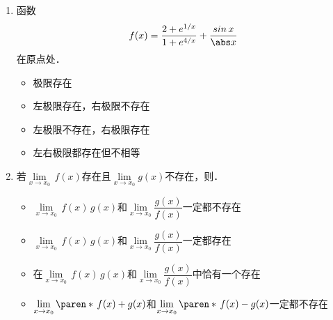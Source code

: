 \documentclass[a4paper,punct=CCT]{ctexbook}
\renewcommand*{\siand}{\shortintertext{和}}
\theoremstyle{definition}
\theoremstyle{remark}
\newif\ifshowsol
\begin{document}
\begin{enumerate}
\item 函数
  \begin{equation*}
    f(x) = \frac{2+e^{1/x}}{1+e^{4/x}} + \frac{\sin x}{\abs x}
  \end{equation*}
  在原点处\uline{\makebox[6em]{}}．
  \begin{itemize}
    \renewcommand{\labelitemi}{\faCircleThin}
    \ifshowsol
  \item[\faCircle]
    \else
  \item
    \fi
    极限存在
  \item 左极限存在，右极限不存在
  \item 左极限不存在，右极限存在
  \item 左右极限都存在但不相等
  \end{itemize}

  \ifshowsol
  实际上，有
  \begin{gather*}
    \lim_{\,x\to0^+} \,f(x)
    = {}\smashoperator[l]{\lim_{\,x\to0^+}} \paren[\bigg]{\frac{2/e^{1/x} + 1}{1/e^{1/x} + e^{3/x}} + \frac{\sin x}{x}}
    = 1
    \siand
    \lim_{\,x\to0^-} \,f(x)
    = {}\smashoperator[l]{\lim_{\,x\to0^-}} \paren[\bigg]{\frac{2+e^{1/x}}{1+e^{4/x}} - \frac{\sin x}{x}}
    = 1.
  \end{gather*}
  所以函数\(f\)在原点处的极限是\(1\)．
  \fi

\item 若\(\lim\limits_{x \to x_0} \,f(x)\)存在且\(\lim\limits_{x \to x_0} g(x)\)不存在，则\uline{\makebox[10em]{}}．
  \begin{itemize}[itemsep=1ex]
    \renewcommand{\labelitemi}{\faCircleThin}
  \item \(\lim\limits_{x \to x_0} \,f(x)\,g(x)\)和\(\lim\limits_{x \to x_0} \dfrac{g(x)}{f(x)}\)一定都不存在
  \item \(\lim\limits_{x \to x_0} \,f(x)\,g(x)\)和\(\lim\limits_{x \to x_0} \dfrac{g(x)}{f(x)}\)一定都存在
  \item 在\(\lim\limits_{x \to x_0} \,f(x)\,g(x)\)和\(\lim\limits_{x \to x_0} \dfrac{g(x)}{f(x)}\)中恰有一个存在
    \ifshowsol
  \item[\faCircle]
    \else
  \item
    \fi
    \(\lim\limits_{x \to x_0} \paren*{\,f(x)+g(x)}\)和\(\lim\limits_{x \to x_0} \paren*{\,f(x)-g(x)}\)一定都不存在
  \end{itemize}

  \ifshowsol
  令\(f(x) = x\)和\(g(x) = 1/x\)，可以证伪选项A和B．在此基础上，令\(g(x) = 1/x^2\)，可以证伪选项C．实际上，在题干的条件下，\(\lim\limits_{x \to x_0} \paren*{\,f(x)+g(x)}\)、\(\lim\limits_{x \to x_0} \paren*{\,f(x)-g(x)}\)和\(\lim\limits_{x \to x_0} \dfrac{g(x)}{f(x)}\)一定都不存在．当\(\lim\limits_{x \to x_0} \,f(x) \ne 0\)时，\(\lim\limits_{x \to x_0} \,f(x)\,g(x)\)一定不存在．当\(\lim\limits_{x \to x_0} \,f(x) = 0\)时，\(\lim\limits_{x \to x_0} \,f(x)\,g(x)\)可能存在也可能不存在．
  \fi


\end{enumerate}
\end{document}
